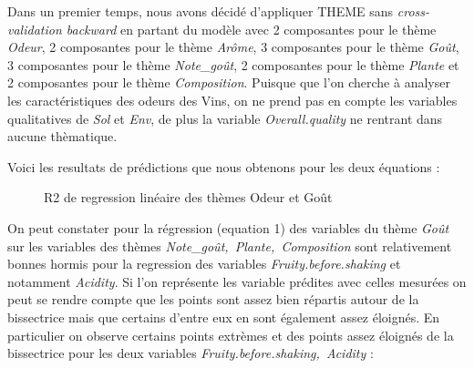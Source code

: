 \documentclass[a4paper,french,10pt]{article}
\begin{document}
Dans un premier temps, nous avons décidé d'appliquer THEME sans \textit{cross-validation backward} en partant du modèle avec 2 composantes pour le thème \textit{Odeur}, 2 composantes pour le thème \textit{Arôme}, 3 composantes pour le thème \textit{Goût}, 3 composantes pour le thème \textit{Note\_goût}, 2 composantes pour le thème \textit{Plante} et 2 composantes pour le thème \textit{Composition}. Puisque que l'on cherche à analyser les caractéristiques des odeurs des Vins, on ne prend pas en compte les variables qualitatives de \textit{Sol} et \textit{Env}, de plus la variable \textit{Overall.quality} ne rentrant dans aucune thèmatique. \newline

Voici les resultats de prédictions que nous obtenons pour les deux équations : 

\begin{figure}[htp] 
	\centering
	\hfill%
	\caption{R2 de regression linéaire des thèmes Odeur et Goût}
\end{figure}

On peut constater pour la régression (equation 1) des variables du thème \textit{Goût} sur les variables des thèmes \textit{Note_goût,~Plante,~Composition} sont relativement bonnes hormis pour la regression des variables \textit{Fruity.before.shaking} et notamment \textit{Acidity}. Si l'on représente les variable prédites avec celles mesurées on peut se rendre compte que les points sont assez bien répartis autour de la bissectrice mais que certains d'entre eux en sont également assez éloignés. En particulier on observe certains points extrèmes et des points assez éloignés de la bissectrice pour les deux variables \textit{Fruity.before.shaking,~Acidity} : 
\end{document}

